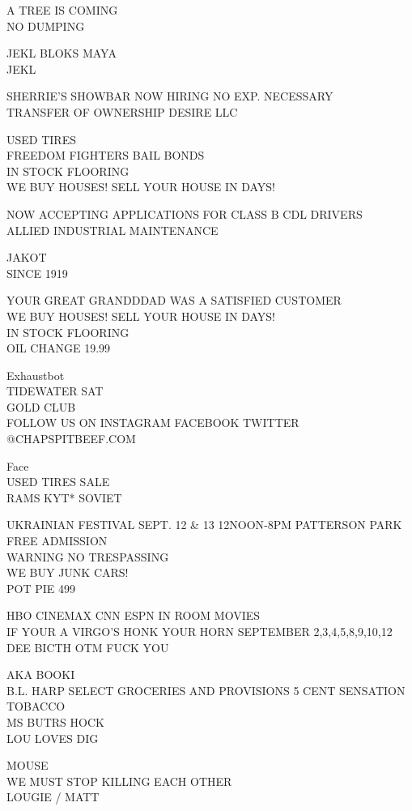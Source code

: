 \documentclass[10pt,letterpaper]{article}
\begin{document}
A TREE IS COMING\\
NO DUMPING

JEKL BLOKS MAYA\\
JEKL

SHERRIE'S SHOWBAR NOW HIRING NO EXP. NECESSARY\\
TRANSFER OF OWNERSHIP DESIRE LLC

USED TIRES\\
FREEDOM FIGHTERS BAIL BONDS\\
IN STOCK FLOORING\\
WE BUY HOUSES!  SELL YOUR HOUSE IN DAYS!

NOW ACCEPTING APPLICATIONS FOR CLASS B CDL DRIVERS\\
ALLIED INDUSTRIAL MAINTENANCE

JAKOT\\
SINCE 1919

YOUR GREAT GRANDDDAD WAS A SATISFIED CUSTOMER\\
WE BUY HOUSES!  SELL YOUR HOUSE IN DAYS!\\
IN STOCK FLOORING\\
OIL CHANGE 19.99

Exhaustbot\\
TIDEWATER SAT\\
GOLD CLUB\\
FOLLOW US ON INSTAGRAM FACEBOOK TWITTER @CHAPSPITBEEF.COM

Face\\
USED TIRES SALE\\
RAMS KYT* SOVIET

UKRAINIAN FESTIVAL SEPT. 12 \& 13 12NOON{-}8PM PATTERSON PARK FREE ADMISSION\\
WARNING NO TRESPASSING\\
WE BUY JUNK CARS!\\
POT PIE 499

HBO CINEMAX CNN ESPN IN ROOM MOVIES\\
IF YOUR A VIRGO'S HONK YOUR HORN SEPTEMBER 2,3,4,5,8,9,10,12\\
DEE BICTH OTM FUCK YOU

AKA BOOKI\\
B.L. HARP SELECT GROCERIES AND PROVISIONS 5 CENT SENSATION TOBACCO\\
MS BUTRS HOCK\\
LOU LOVES DIG

MOUSE\\
WE MUST STOP KILLING EACH OTHER\\
LOUGIE / MATT
\end{document}
